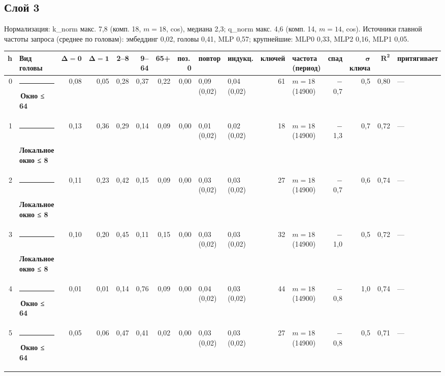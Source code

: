 \documentclass[10pt]{article}
\begin{document}
\par\vspace{0.4em}
\noindent\begin{minipage}{\linewidth}
\subsection*{Слой 3}
{\small\color{ink2} Нормализация: k\_norm макс. 7,8 (комп. 18, $m{=}18$, cos), медиана 2,3; q\_norm макс. 4,6 (комп. 14, $m{=}14$, cos). Источники главной частоты запроса (среднее по головам): эмбеддинг 0,02, головы 0,41, MLP 0,57; крупнейшие: MLP0 0,33, MLP2 0,16, MLP1 0,05.}
\begin{center}{\footnotesize\begin{tabular}{|r|l|r|r|r|r|r|r|l|l|r|l|r|r|r|l|}
\hline
\rowcolor{head}\textbf{h} & \textbf{Вид головы} & $\boldsymbol{\Delta{=}0}$ & $\boldsymbol{\Delta{=}1}$ & \textbf{2–8} & \textbf{9–64} & \textbf{65+} & \textbf{поз.\,0} & \textbf{повтор} & \textbf{индукц.} & \textbf{ключей} & \textbf{частота (период)} & \textbf{спад} & $\boldsymbol{\sigma}$ \textbf{ключа} & $\boldsymbol{R^2}$ & \textbf{притягивает} \\ \hline
0 & \textcolor[HTML]{EDA100}{\rule{0.62em}{0.62em}}\,\textbf{Окно ≤ 64} & 0,08 & 0,05 & 0,28 & 0,37 & 0,22 & 0,00 & 0,09 (0,02) & 0,04 (0,02) & 61 & $m{=}18$ (14900) & $-$0,7 & 0,5 & 0,80 & — \\ \hline
1 & \textcolor[HTML]{1BAF7A}{\rule{0.62em}{0.62em}}\,\textbf{Локальное окно ≤ 8} & 0,13 & 0,36 & 0,29 & 0,14 & 0,09 & 0,00 & 0,01 (0,02) & 0,02 (0,02) & 18 & $m{=}18$ (14900) & $-$1,3 & 0,7 & 0,72 & — \\ \hline
2 & \textcolor[HTML]{1BAF7A}{\rule{0.62em}{0.62em}}\,\textbf{Локальное окно ≤ 8} & 0,11 & 0,23 & 0,42 & 0,15 & 0,09 & 0,00 & 0,03 (0,02) & 0,03 (0,02) & 27 & $m{=}18$ (14900) & $-$0,7 & 0,6 & 0,74 & — \\ \hline
3 & \textcolor[HTML]{1BAF7A}{\rule{0.62em}{0.62em}}\,\textbf{Локальное окно ≤ 8} & 0,10 & 0,20 & 0,45 & 0,11 & 0,15 & 0,00 & 0,03 (0,02) & 0,03 (0,02) & 32 & $m{=}18$ (14900) & $-$1,0 & 0,5 & 0,72 & — \\ \hline
4 & \textcolor[HTML]{EDA100}{\rule{0.62em}{0.62em}}\,\textbf{Окно ≤ 64} & 0,01 & 0,01 & 0,14 & 0,76 & 0,09 & 0,00 & 0,04 (0,02) & 0,03 (0,02) & 44 & $m{=}18$ (14900) & $-$0,8 & 1,0 & 0,74 & — \\ \hline
5 & \textcolor[HTML]{EDA100}{\rule{0.62em}{0.62em}}\,\textbf{Окно ≤ 64} & 0,05 & 0,06 & 0,47 & 0,41 & 0,02 & 0,00 & 0,03 (0,02) & 0,03 (0,02) & 27 & $m{=}18$ (14900) & $-$0,8 & 0,5 & 0,71 & — \\ \hline

\end{tabular}}
\end{center}
\end{minipage}
\end{document}
